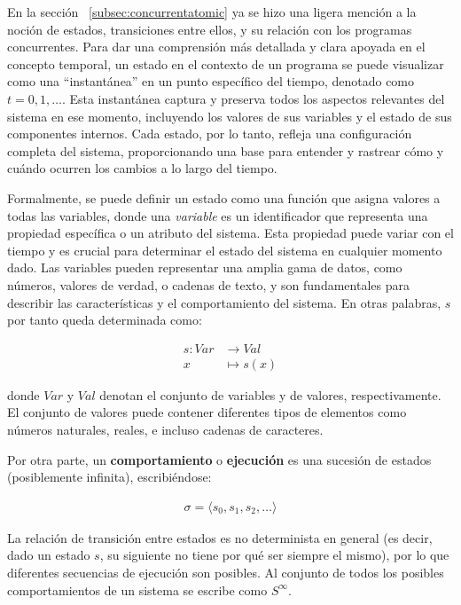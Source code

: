 En la sección ~\ref{subsec:concurrentatomic} ya se hizo una ligera mención a la noción de estados, transiciones entre ellos, y su relación con los programas concurrentes. Para dar una comprensión más detallada y clara apoyada en el concepto temporal, un estado en el contexto de un programa se puede visualizar como una ``instantánea'' en un punto específico del tiempo, denotado como $t = 0, 1, \ldots$. Esta instantánea captura y preserva todos los aspectos relevantes del sistema en ese momento, incluyendo los valores de sus variables y el estado de sus componentes internos. Cada estado, por lo tanto, refleja una configuración completa del sistema, proporcionando una base para entender y rastrear cómo y cuándo ocurren los cambios a lo largo del tiempo. 

Formalmente, se puede definir un estado como una función que asigna valores a todas las variables, donde una \textit{variable}  es un identificador que representa una propiedad específica o un atributo del sistema. Esta propiedad puede variar con el tiempo y es crucial para determinar el estado del sistema en cualquier momento dado. Las variables pueden representar una amplia gama de datos, como números, valores de verdad, o cadenas de texto, y son fundamentales para describir las características y el comportamiento del sistema. En otras palabras, $s$ por tanto queda determinada como:

\begin{align*}
    s : Var &\to Val \\
    x &\mapsto s(x)
\end{align*}

donde $Var$ y $Val$ denotan el conjunto de variables y de valores, respectivamente. El conjunto de valores puede contener diferentes tipos de elementos como números naturales, reales, e incluso cadenas de caracteres.

Por otra parte, un \textbf{comportamiento} o \textbf{ejecución} es una sucesión de estados (posiblemente infinita), escribiéndose:

\begin{align*}
    \sigma = \langle s_0, s_1, s_2, \ldots \rangle
\end{align*}

La relación de transición entre estados es no determinista en general (es decir, dado un estado $s$, su siguiente no tiene por qué ser siempre el mismo), por lo que diferentes secuencias de ejecución son posibles. Al conjunto de todos los posibles comportamientos de un sistema se escribe como $S^\infty$.

